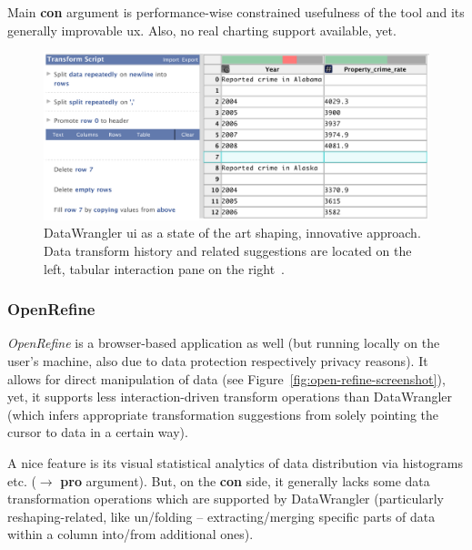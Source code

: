 Main \textbf{con} argument is performance-wise constrained usefulness of the tool and its generally improvable \gls{ux}.
Also, no real charting support available, yet.

\begin{figure}[h]
  \centering
  \includegraphics[width=1.0\textwidth]{figures/state-of-the-art/data-wrangler}
  \caption{DataWrangler \gls{ui} as a state of the art shaping, innovative approach. Data transform history and related suggestions are located on the left, tabular interaction pane on the right~\cite{Kandel2011a}.}
  \label{fig:data-wrangler-screenshot}
\end{figure}


\subsubsection{OpenRefine}

\emph{OpenRefine} is a browser-based application as well (but running locally on the user's machine, also due to data protection respectively privacy reasons).
It allows for direct manipulation of data (see Figure~\ref{fig:open-refine-screenshot}), yet, it supports less interaction-driven transform operations than DataWrangler (which infers appropriate transformation suggestions from solely pointing the cursor to data in a certain way).

A nice feature is its visual statistical analytics of data distribution via histograms etc. ($\rightarrow$ \textbf{pro} argument).
But, on the \textbf{con} side, it generally lacks some data transformation operations which are supported by DataWrangler (particularly reshaping-related, like un/folding -- extracting/merging specific parts of data within a column into/from additional ones).

